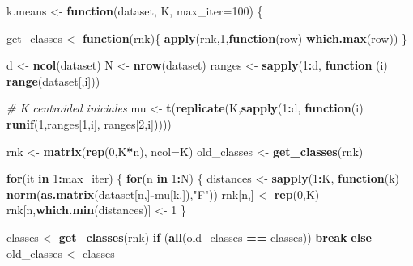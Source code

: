\documentclass[11pt,]{article}
\newenvironment{Shaded}{\begin{snugshade}}{\end{snugshade}}
\newcommand{\KeywordTok}[1]{\textcolor[rgb]{0.13,0.29,0.53}{\textbf{#1}}}
\newcommand{\DataTypeTok}[1]{\textcolor[rgb]{0.13,0.29,0.53}{#1}}
\newcommand{\DecValTok}[1]{\textcolor[rgb]{0.00,0.00,0.81}{#1}}
\newcommand{\StringTok}[1]{\textcolor[rgb]{0.31,0.60,0.02}{#1}}
\newcommand{\CommentTok}[1]{\textcolor[rgb]{0.56,0.35,0.01}{\textit{#1}}}
\newcommand{\ControlFlowTok}[1]{\textcolor[rgb]{0.13,0.29,0.53}{\textbf{#1}}}
\newcommand{\OperatorTok}[1]{\textcolor[rgb]{0.81,0.36,0.00}{\textbf{#1}}}
\newcommand{\NormalTok}[1]{#1}
\begin{document}
\begin{Shaded}
\begin{Highlighting}[]
\NormalTok{k.means <-}\StringTok{ }\ControlFlowTok{function}\NormalTok{(dataset, K, }\DataTypeTok{max_iter=}\DecValTok{100}\NormalTok{) \{}
  
\NormalTok{  get_classes <-}\StringTok{ }\ControlFlowTok{function}\NormalTok{(rnk)\{}
    \KeywordTok{apply}\NormalTok{(rnk,}\DecValTok{1}\NormalTok{,}\ControlFlowTok{function}\NormalTok{(row) }\KeywordTok{which.max}\NormalTok{(row))}
\NormalTok{    \}}
  
\NormalTok{  d <-}\StringTok{ }\KeywordTok{ncol}\NormalTok{(dataset)}
\NormalTok{  N <-}\StringTok{ }\KeywordTok{nrow}\NormalTok{(dataset)}
\NormalTok{  ranges <-}\StringTok{ }\KeywordTok{sapply}\NormalTok{(}\DecValTok{1}\OperatorTok{:}\NormalTok{d, }\ControlFlowTok{function}\NormalTok{ (i) }\KeywordTok{range}\NormalTok{(dataset[,i]))}
  
  \CommentTok{# K centroided iniciales}
\NormalTok{  mu <-}\StringTok{ }\KeywordTok{t}\NormalTok{(}\KeywordTok{replicate}\NormalTok{(K,}\KeywordTok{sapply}\NormalTok{(}\DecValTok{1}\OperatorTok{:}\NormalTok{d, }
                             \ControlFlowTok{function}\NormalTok{(i) }\KeywordTok{runif}\NormalTok{(}\DecValTok{1}\NormalTok{,ranges[}\DecValTok{1}\NormalTok{,i], ranges[}\DecValTok{2}\NormalTok{,i]))))}
  
\NormalTok{  rnk <-}\StringTok{ }\KeywordTok{matrix}\NormalTok{(}\KeywordTok{rep}\NormalTok{(}\DecValTok{0}\NormalTok{,K}\OperatorTok{*}\NormalTok{n), }\DataTypeTok{ncol=}\NormalTok{K)}
\NormalTok{  old_classes <-}\StringTok{ }\KeywordTok{get_classes}\NormalTok{(rnk)}
  
  \ControlFlowTok{for}\NormalTok{(it }\ControlFlowTok{in} \DecValTok{1}\OperatorTok{:}\NormalTok{max_iter) \{}
    \ControlFlowTok{for}\NormalTok{(n }\ControlFlowTok{in} \DecValTok{1}\OperatorTok{:}\NormalTok{N) \{}
\NormalTok{      distances <-}\StringTok{ }\KeywordTok{sapply}\NormalTok{(}\DecValTok{1}\OperatorTok{:}\NormalTok{K, }\ControlFlowTok{function}\NormalTok{(k) }
        \KeywordTok{norm}\NormalTok{(}\KeywordTok{as.matrix}\NormalTok{(dataset[n,]}\OperatorTok{-}\NormalTok{mu[k,]),}\StringTok{"F"}\NormalTok{))}
\NormalTok{      rnk[n,]   <-}\StringTok{ }\KeywordTok{rep}\NormalTok{(}\DecValTok{0}\NormalTok{,K)}
\NormalTok{      rnk[n,}\KeywordTok{which.min}\NormalTok{(distances)] <-}\StringTok{ }\DecValTok{1}
\NormalTok{    \}}
    
\NormalTok{    classes <-}\StringTok{ }\KeywordTok{get_classes}\NormalTok{(rnk)}
    \ControlFlowTok{if}\NormalTok{ (}\KeywordTok{all}\NormalTok{(old_classes }\OperatorTok{==}\StringTok{ }\NormalTok{classes))}
      \ControlFlowTok{break}
    \ControlFlowTok{else} 
\NormalTok{      old_classes <-}\StringTok{ }\NormalTok{classes}
    

\end{Highlighting}
\end{Shaded}
\end{document}
